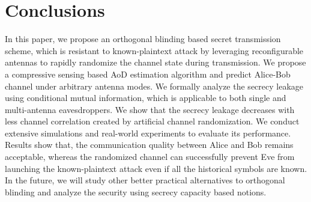 \section{Conclusions}
In this paper, we propose an orthogonal blinding based secret transmission scheme, which is resistant to  known-plaintext attack by leveraging reconfigurable antennas  to rapidly randomize the channel state during transmission. We propose a compressive sensing based AoD estimation algorithm and  predict Alice-Bob  channel under  arbitrary antenna modes. We formally analyze the secrecy leakage using conditional mutual information, which is applicable to both single and multi-antenna eavesdroppers. We show that the secrecy leakage decreases with less channel correlation created by  artificial    channel randomization. We conduct extensive simulations and real-world experiments to evaluate its performance. Results show that, the communication quality between Alice and Bob remains acceptable, whereas the randomized channel can successfully prevent Eve from   launching the known-plaintext attack even if all the historical symbols are known. In the future, we will study other better practical alternatives to orthogonal blinding and analyze the security using secrecy capacity based notions.